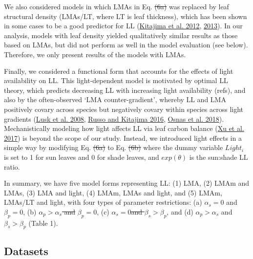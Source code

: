 \documentclass[
  12pt,
  a4paper,
,tablecaptionabove
]{scrartcl}
\providecommand{\DIFaddtex}[1]{{\protect\color{blue}\uwave{#1}}} %
\providecommand{\DIFdeltex}[1]{{\protect\color{red}\sout{#1}}}                      %
\providecommand{\DIFaddbegin}{} %
\providecommand{\DIFaddend}{} %
\providecommand{\DIFdelbegin}{} %
\providecommand{\DIFdelend}{} %
\providecommand{\DIFadd}[1]{\texorpdfstring{\DIFaddtex{#1}}{#1}} %
\providecommand{\DIFdel}[1]{\texorpdfstring{\DIFdeltex{#1}}{}} %
\newcommand{\DIFscaledelfig}{0.5}
\newlength{\DIFdelgraphicswidth} %
\newlength{\DIFdelgraphicsheight} %
\newcommand{\DIFaddincludegraphics}[2][]{{\color{blue}\fbox{\DIFOincludegraphics[#1]{#2}}}} %
\newcommand{\DIFdelincludegraphics}[2][]{%
\sbox{\DIFdelgraphicsbox}{\DIFOincludegraphics[#1]{#2}}%
\settoboxwidth{\DIFdelgraphicswidth}{\DIFdelgraphicsbox} %
\settoboxtotalheight{\DIFdelgraphicsheight}{\DIFdelgraphicsbox} %
\scalebox{\DIFscaledelfig}{%
\parbox[b]{\DIFdelgraphicswidth}{\usebox{\DIFdelgraphicsbox}\\[-\baselineskip] \rule{\DIFdelgraphicswidth}{0em}}\llap{\resizebox{\DIFdelgraphicswidth}{\DIFdelgraphicsheight}{%
\setlength{\unitlength}{\DIFdelgraphicswidth}%
\begin{picture}(1,1)%
\thicklines\linethickness{2pt} %
{\color[rgb]{1,0,0}\put(0,0){\framebox(1,1){}}}%
{\color[rgb]{1,0,0}\put(0,0){\line( 1,1){1}}}%
{\color[rgb]{1,0,0}\put(0,1){\line(1,-1){1}}}%
\end{picture}%
}\hspace*{3pt}}} %
} %
\DeclareRobustCommand{\DIFaddbegin}{\DIFOaddbegin \let\includegraphics\DIFaddincludegraphics} %
\DeclareRobustCommand{\DIFaddend}{\DIFOaddend \let\includegraphics\DIFOincludegraphics} %
\DeclareRobustCommand{\DIFdelbegin}{\DIFOdelbegin \let\includegraphics\DIFdelincludegraphics} %
\DeclareRobustCommand{\DIFdelend}{\DIFOaddend \let\includegraphics\DIFOincludegraphics} %
\begin{document}
We also considered models in which LMAs in Eq.
\DIFdelbegin \DIFdel{(6a) }\DIFdelend \DIFaddbegin \DIFadd{\ref{eq:LL_pot}-\ref{eq:LL_opt} }\DIFaddend was replaced by leaf structural density
(LMAs/LT, where LT is leaf thickness), which has been shown in some
cases to be a good predictor for LL
(\protect\hyperlink{ref-Kitajima2012}{Kitajima et al. 2012},
\protect\hyperlink{ref-Kitajima2013}{2013}). In our analysis, models
with leaf density yielded qualitatively similar results as those based
on LMAs, but did not perform as well in the model evaluation (see
below). Therefore, we only present results of the models with LMAs.

Finally, we considered a functional form that accounts for the effects
of light availability on LL. This light-dependent model is motivated by
optimal LL theory, which predicts decreasing LL with increasing light
availability (refs), and also by the often-observed `LMA
counter-gradient', whereby LL and LMA positively covary across species
but negatively covary within species across light gradients
(\protect\hyperlink{ref-Lusk2008}{Lusk et al. 2008},
\protect\hyperlink{ref-Russo2016}{Russo and Kitajima 2016},
\protect\hyperlink{ref-Osnas2018}{Osnas et al. 2018}). Mechanistically
modeling how light affects LL via leaf carbon balance
(\protect\hyperlink{ref-Xu2017}{Xu et al. 2017}) is beyond the scope of
our study. Instead, we introduced light effects in a simple way by
modifying Eq. \DIFdelbegin \DIFdel{(6a) }\DIFdelend \DIFaddbegin \DIFadd{\ref{eq:LL_pot} }\DIFaddend to Eq. \DIFdelbegin \DIFdel{(6b) }\DIFdelend \DIFaddbegin \DIFadd{\ref{eq:LL_opt} }\DIFaddend where the dummy
variable \(Light_i\) is set to 1 for sun leaves and 0 for shade leaves,
and \(exp(\theta)\) is the sun:shade LL ratio.

In summary, we have five model forms representing LL: (1) LMA, (2) LMAm
and LMAs, (3) LMA and light, (4) LMAm, LMAs and light, and (5) LMAm,
LMAs/LT and light, with four types of parameter restrictions: (a)
\(\alpha_s = 0\) and \(\beta_p = 0\), (b) \DIFdelbegin \DIFdel{\(\alpha_p > \alpha_s\) and }\DIFdelend \(\beta_p = 0\), (c)
\(\alpha_s = 0\)\DIFdelbegin \DIFdel{and \(\beta_s > \beta_p\)}\DIFdelend , and (d) \(\alpha_p > \alpha_s\) and
\(\beta_s > \beta_p\) (Table 1).

\hypertarget{datasets}{%
\subsection{Datasets}\label{datasets}}
\end{document}
